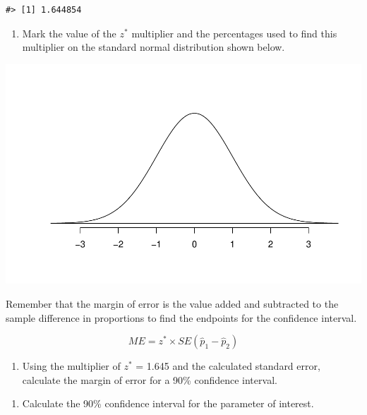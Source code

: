 \documentclass[
]{report}
\providecommand{\tightlist}{%
  \setlength{\itemsep}{0pt}\setlength{\parskip}{0pt}}
\begin{document}
\begin{verbatim}
#> [1] 1.644854
\end{verbatim}

\begin{enumerate}
\def\labelenumi{\arabic{enumi}.}
\setcounter{enumi}{11}
\tightlist
\item
  Mark the value of the \(z^*\) multiplier and the percentages used to find this multiplier on the standard normal distribution shown below.
\end{enumerate}

\begin{center}\includegraphics[width=0.5\linewidth]{09-A20-inference-2cat-CIs_files/figure-latex/standNormc-1} \end{center}

\vspace{1mm}

Remember that the margin of error is the value added and subtracted to the sample difference in proportions to find the endpoints for the confidence interval.

\[ME = z^*\times SE(\hat{p}_1 - \hat{p}_2)\]

\begin{enumerate}
\def\labelenumi{\arabic{enumi}.}
\setcounter{enumi}{12}
\tightlist
\item
  Using the multiplier of \(z^*\) = 1.645 and the calculated standard error, calculate the margin of error for a 90\% confidence interval.
\end{enumerate}

\vspace{0.8in}

\begin{enumerate}
\def\labelenumi{\arabic{enumi}.}
\setcounter{enumi}{13}
\tightlist
\item
  Calculate the 90\% confidence interval for the parameter of interest.
\end{enumerate}

\vspace{1in}

\newpage
\end{document}
